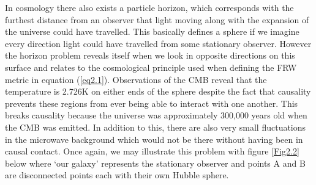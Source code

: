 \documentclass[a4paper,12pt,twoside]{report}
\begin{document}
In cosmology there also exists a particle horizon, which corresponds with the furthest distance from an observer that light moving along with the expansion of the universe could have travelled. This basically defines a sphere if we imagine every direction light could have travelled from some stationary observer. However the horizon problem reveals itself when we look in opposite directions on this surface and relates to the cosmological principle used when defining the FRW metric in equation (\ref{eq2.1}). Observations of the CMB reveal that the temperature is 2.726K \cite{Mather:1993ij} on either ends of the sphere despite the fact that causality prevents these regions from ever being able to interact with one another. This breaks causality because the universe was approximately 300,000 years old when the CMB was emitted. In addition to this, there are also very small fluctuations in the microwave background which would not be there without having been in causal contact. Once again, we may illustrate this problem with figure \ref{Fig2.2} below where `our galaxy' represents the stationary observer and points A and B are disconnected points each with their own Hubble sphere.
\end{document}
